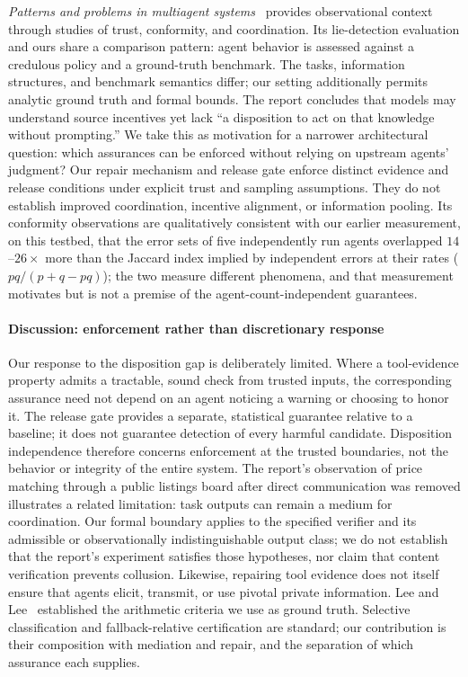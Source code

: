\documentclass[conference]{IEEEtran}
\begin{document}
\emph{Patterns and problems in multiagent systems}~\cite{anthropic2026}
provides observational context through studies of trust, conformity,
and coordination. Its lie-detection evaluation and ours share a
comparison pattern: agent behavior is assessed against a credulous
policy and a ground-truth benchmark. The tasks, information
structures, and benchmark semantics differ; our setting additionally
permits analytic ground truth and formal bounds. The report concludes
that models may understand source incentives yet lack ``a disposition
to act on that knowledge without prompting.'' We take this as
motivation for a narrower architectural question: which assurances can
be enforced without relying on upstream agents' judgment? Our repair
mechanism and release gate enforce distinct evidence and release
conditions under explicit trust and sampling assumptions. They do not
establish improved coordination, incentive alignment, or information
pooling. Its conformity observations are qualitatively consistent with
our earlier measurement, on this testbed, that the error sets of five
independently run agents overlapped $14$--$26\times$ more than the
Jaccard index implied by independent errors at their rates
($pq/(p+q-pq)$); the two measure different phenomena, and that
measurement motivates but is not a premise of the agent-count-independent
guarantees.

\paragraph{Discussion: enforcement rather than discretionary response}
Our response to the disposition gap is deliberately limited. Where a
tool-evidence property admits a tractable, sound check from trusted
inputs, the corresponding assurance need not depend on an agent
noticing a warning or choosing to honor it. The release gate provides a
separate, statistical guarantee relative to a baseline; it does not
guarantee detection of every harmful candidate. Disposition
independence therefore concerns enforcement at the trusted boundaries,
not the behavior or integrity of the entire system. The report's
observation of price matching through a public listings board after
direct communication was removed illustrates a related limitation:
task outputs can remain a medium for coordination. Our formal boundary
applies to the specified verifier and its admissible or
observationally indistinguishable output class; we do not establish
that the report's experiment satisfies those hypotheses, nor claim that
content verification prevents collusion. Likewise, repairing tool
evidence does not itself ensure that agents elicit, transmit, or use
pivotal private information. Lee and Lee~\cite{leelee2025} established the arithmetic
criteria we use as ground truth. Selective classification and
fallback-relative certification are standard; our contribution is
their composition with mediation and repair, and the separation of
which assurance each supplies.
\end{document}
